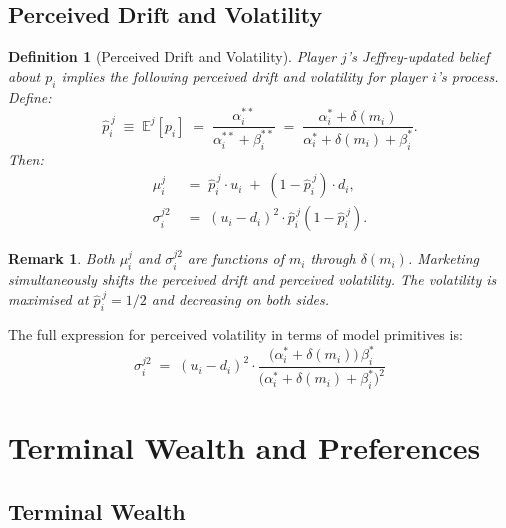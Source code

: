 \documentclass[12pt,a4paper]{article}
\newtheorem{definition}{Definition}[section]
\newtheorem{remark}{Remark}[section]
\newcommand{\E}{\mathbb{E}}
\newcommand{\1}{\mathbf{1}}
\newcommand{\hatpij}{\hat{p}_i^{\,j}}
\begin{document}
\subsection{Perceived Drift and Volatility}

\begin{definition}[Perceived Drift and Volatility]
Player $j$'s Jeffrey-updated belief about $p_i$ implies the following perceived drift and volatility for player $i$'s process. Define:
\[
  \hatpij \;\equiv\; \E^j[p_i] \;=\; \frac{\alpha_i^{**}}{\alpha_i^{**} + \beta_i^{**}}
  \;=\; \frac{\alpha_i^* + \delta(m_i)}{\alpha_i^* + \delta(m_i) + \beta_i^*}.
\]
Then:
\begin{align}
  \mu_i^j &\;=\; \hatpij \cdot u_i \;+\; (1 - \hatpij) \cdot d_i, \label{eq:perceived_drift}\\
  \sigma_i^{j2} &\;=\; (u_i - d_i)^2 \cdot \hatpij \left(1 - \hatpij\right). \label{eq:perceived_vol}
\end{align}
\end{definition}

\begin{remark}
Both $\mu_i^j$ and $\sigma_i^{j2}$ are functions of $m_i$ through $\delta(m_i)$. Marketing simultaneously shifts the perceived drift and perceived volatility. The volatility is maximised at $\hatpij = 1/2$ and decreasing on both sides.
\end{remark}

The full expression for perceived volatility in terms of model primitives is:
\begin{equation}
  \boxed{
    \sigma_i^{j2} \;=\; (u_i - d_i)^2 \cdot
    \frac{\bigl(\alpha_i^* + \delta(m_i)\bigr)\,\beta_i^*}
         {\bigl(\alpha_i^* + \delta(m_i) + \beta_i^*\bigr)^2}
  }
  \label{eq:vol_full}
\end{equation}

\section{Terminal Wealth and Preferences}

\subsection{Terminal Wealth}
\end{document}
